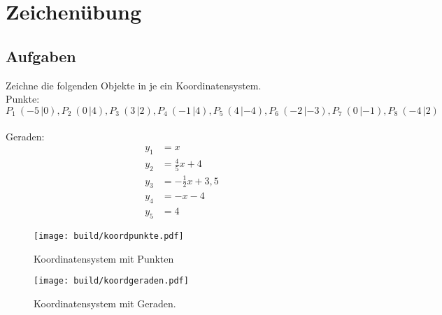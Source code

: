 


    \section*{Zeichenübung}
    \subsection*{Aufgaben}
    Zeichne die folgenden Objekte in je ein Koordinatensystem.\\
    Punkte:\\
    $P_1\:(-5\,|0), P_2\:(0\,|4), P_3\:(3\,|2), P_4\:(-1\,|4), P_5\:(4\,|-4), P_6\:(-2\,|-3), P_7\:(0\,|-1), P_8\:(-4\,|2)$\\~\\
    Geraden:
    \begin{align}
        y_1&=x\\
        y_2&=\frac{4}{5}x+4\\
        y_3&=-\frac{1}{2}x+3,5\\
        y_4&=-x-4\\
        y_5&=4
    \end{align}
    \begin{figure}
        \centering
        \texttt{[image: build/koordpunkte.pdf]}
        \caption{Koordinatensystem mit Punkten}
    \end{figure}
    \begin{figure}
        \centering
        \texttt{[image: build/koordgeraden.pdf]}
        \caption{Koordinatensystem mit Geraden.}
    \end{figure}


